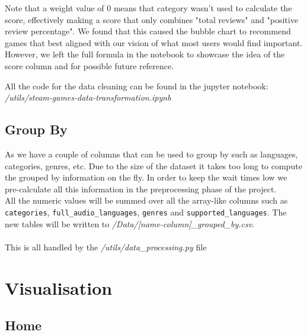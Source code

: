 \documentclass{article}
\begin{document}
    Note that a weight value of 0 means that category wasn't used to calculate the score, effectively making a score that only combines "total reviews" and "positive review percentage". We found that this caused the bubble chart to recommend games that best aligned with our vision of what most users would find important. However, we left the full formula in the notebook to showcase the idea of the score column and for possible future reference.
    
	All the code for the data cleaning can be found in the jupyter notebook: \textit{/utils/steam-games-data-transformation.ipynb}
	
	\subsection{Group By}
	
	As we have a couple of columns that can be used to group by such as languages, categories, genres, etc. Due to the size of the dataset it takes too long to compute the grouped by information on the fly. In order to keep the wait times low we pre-calculate all this information in the preprocessing phase of the project.\\
	All the numeric values will be summed over all the array-like columns such as \texttt{categories}, \texttt{full\_audio\_languages}, \texttt{genres} and \texttt{supported\_languages}. The new tables will be written to \textit{/Data/[name-column]\_grouped\_by.csv}.\\
	\\
	This is all handled by the \textit{/utils/data\_processing.py} file
	\newpage
	
	\section{Visualisation}
	\subsection{Home}
\end{document}
